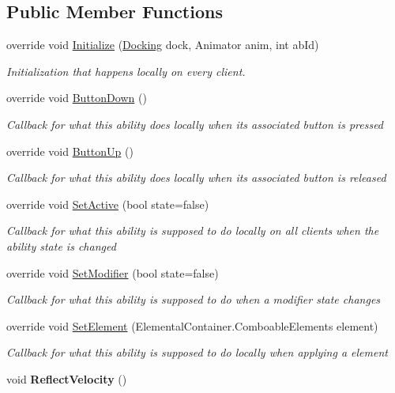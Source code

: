 \subsection*{Public Member Functions}
\begin{DoxyCompactItemize}
\item 
override void \hyperlink{class_boomerang_throw_a757453f2578bc791773b5767eb80f39d}{Initialize} (\hyperlink{class_docking}{Docking} dock, Animator anim, int ab\+Id)
\begin{DoxyCompactList}\small\item\em Initialization that happens locally on every client. \end{DoxyCompactList}\item 
override void \hyperlink{class_boomerang_throw_a69416792bf4c3cb495d6d99ef4341fd3}{Button\+Down} ()
\begin{DoxyCompactList}\small\item\em Callback for what this ability does locally when its associated button is pressed \end{DoxyCompactList}\item 
override void \hyperlink{class_boomerang_throw_a058894b26dc8d46886d79faefa4e36aa}{Button\+Up} ()
\begin{DoxyCompactList}\small\item\em Callback for what this ability does locally when its associated button is released \end{DoxyCompactList}\item 
override void \hyperlink{class_boomerang_throw_a29ac29357a95847a547321b091b2c8b3}{Set\+Active} (bool state=false)
\begin{DoxyCompactList}\small\item\em Callback for what this ability is supposed to do locally on all clients when the ability state is changed \end{DoxyCompactList}\item 
override void \hyperlink{class_boomerang_throw_abd3070a4e57ae10d7578d6de618b5c2e}{Set\+Modifier} (bool state=false)
\begin{DoxyCompactList}\small\item\em Callback for what this ability is supposed to do when a modifier state changes \end{DoxyCompactList}\item 
override void \hyperlink{class_boomerang_throw_aec0765805c6cbbb18eb8ab37395b52f5}{Set\+Element} (Elemental\+Container.\+Comboable\+Elements element)
\begin{DoxyCompactList}\small\item\em Callback for what this ability is supposed to do locally when applying a element \end{DoxyCompactList}\item 
\hypertarget{class_boomerang_throw_a53fac9ec7f1e88e35fefc4bfee79dba2}{}\label{class_boomerang_throw_a53fac9ec7f1e88e35fefc4bfee79dba2} 
void {\bfseries Reflect\+Velocity} ()
\end{DoxyCompactItemize}
